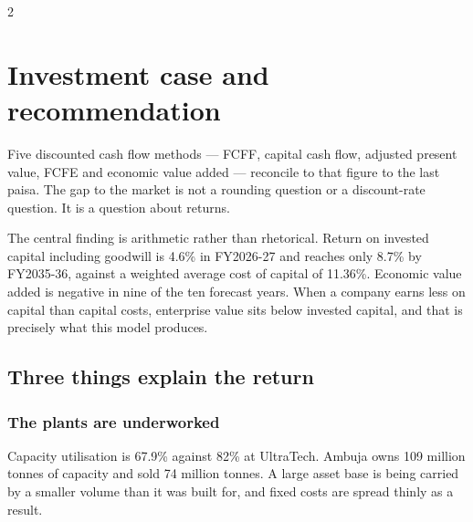 
\setcounter{section}{0}


\begin{paracol}{2}
\section{Investment case and recommendation}

 Five discounted cash flow methods
— FCFF, capital cash flow, adjusted present value, FCFE and economic value added —
reconcile to that figure to the last paisa. The gap to the market is not a rounding
question or a discount-rate question. It is a question about returns.

The central finding is arithmetic rather than rhetorical. Return on invested
capital including goodwill is 4.6\% in FY2026-27 and reaches only 8.7\% by
FY2035-36, against a weighted average cost of capital of 11.36\%. Economic value
added is negative in nine of the ten forecast years. When a company earns less on
capital than capital costs, enterprise value sits below invested capital, and that
is precisely what this model produces.

\subsection{Three things explain the return}

\subsubsection{The plants are underworked} Capacity utilisation is 67.9\% against
82\% at UltraTech. Ambuja owns 109 million tonnes of capacity and sold 74 million
tonnes. A large asset base is being carried by a smaller volume than it was built
for, and fixed costs are spread thinly as a result.


\end{paracol}
